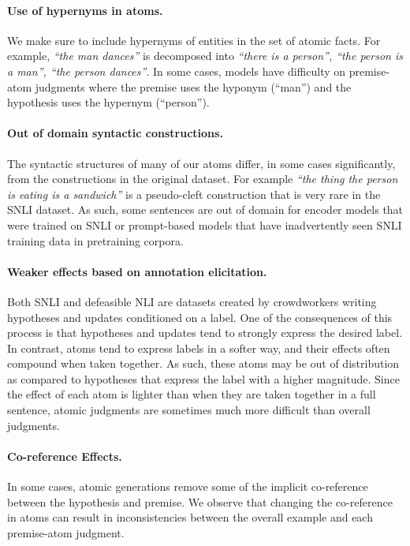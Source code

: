 \paragraph{Use of hypernyms in atoms.} We make sure to include hypernyms of entities in the set of atomic facts. 
%
For example, \textit{``the man dances''} is decomposed into \textit{``there is a person'', ``the person is a man'', ``the person dances''}. 
%
In some cases, models have difficulty on premise-atom judgments where the premise uses the hyponym (``man'') and the hypothesis uses the hypernym (``person'').

\paragraph{Out of domain syntactic constructions.} The syntactic structures of many of our atoms differ, in some cases significantly, from the constructions in the original dataset. For example \textit{``the thing the person is eating is a sandwich''} is a pseudo-cleft construction that is very rare in the SNLI dataset. 
%
As such, some sentences are out of domain for encoder models that were trained on SNLI or prompt-based models that have inadvertently seen SNLI training data in pretraining corpora.

\paragraph{Weaker effects based on annotation elicitation.} Both SNLI and defeasible NLI are datasets created by crowdworkers writing hypotheses and updates conditioned on a label. 
%
One of the consequences of this process is that hypotheses and updates tend to strongly express the desired label.
%
In contrast, atoms tend to express labels in a softer way, and their effects often compound when taken together.
%
As such, these atoms may be out of distribution as compared to hypotheses that express the label with a higher magnitude.
%
Since the effect of each atom is lighter than when they are taken together in a full sentence, atomic judgments are sometimes much more difficult than overall judgments.

\paragraph{Co-reference Effects.} In some cases, atomic generations remove some of the implicit co-reference between the hypothesis and premise. 
%
We observe that changing the co-reference in atoms can result in inconsistencies between the overall example and each premise-atom judgment.



